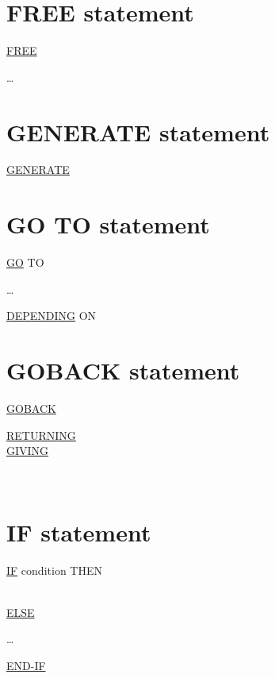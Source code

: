 \documentclass[a4paper,oneside,svgnames]{scrbook}
\makeatletter
\newcommand{\key}[1]{\underline{#1}}
\newcommand{\miscext}[1]{%
  \colorbox{blue!50}{#1}}
\newcommand{\pending}[1]{%
  \textcolor{gray!75}{#1}}
\newenvironment{0-1}{$\left[ \begin{tabular}{@{}l@{}}}{\end{tabular} \right]$}
\newenvironment{1=}{$\left\{ \begin{tabular}{@{}l@{}}}{\end{tabular} \right\}$}
\makeatother
\begin{document}
\section{FREE statement}

\key{FREE}
\begin{1=}
  \identifier
\end{1=} \ldots

\section{GENERATE statement}

\pending{\key{GENERATE} \reportname}

\section{GO TO statement}

\key{GO} TO
\begin{1=}
  \procedurename
\end{1=} \ldots
\begin{0-1}
  \key{DEPENDING} ON \identifier
\end{0-1}

\section{GOBACK statement}

\key{GOBACK}
\begin{0-1}
  \begin{1=}
    \key{RETURNING} \\
    \miscext{\key{GIVING}}
  \end{1=}
  \begin{1=}
    \identifier \\
    \literal
  \end{1=}
\end{0-1}

\section{IF statement}

\key{IF} condition THEN
\begin{1=}
  \imperativestatement \\
  \key{ELSE} \imperativestatement
\end{1=} \ldots

\begin{0-1}
  \key{END-IF}
\end{0-1}
\end{document}
